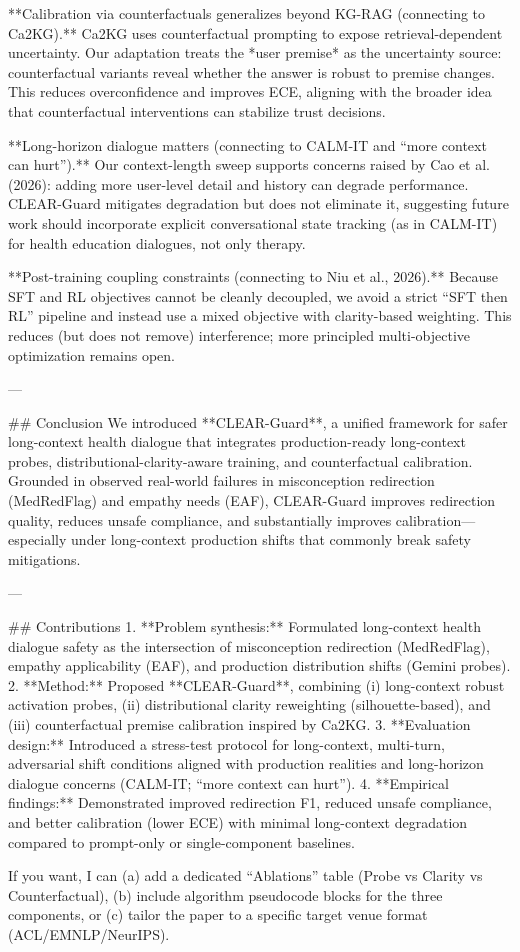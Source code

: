 **Calibration via counterfactuals generalizes beyond KG-RAG (connecting to Ca2KG).**  
Ca2KG uses counterfactual prompting to expose retrieval-dependent uncertainty. Our adaptation treats the *user premise* as the uncertainty source: counterfactual variants reveal whether the answer is robust to premise changes. This reduces overconfidence and improves ECE, aligning with the broader idea that counterfactual interventions can stabilize trust decisions.

**Long-horizon dialogue matters (connecting to CALM-IT and “more context can hurt”).**  
Our context-length sweep supports concerns raised by Cao et al. (2026): adding more user-level detail and history can degrade performance. CLEAR-Guard mitigates degradation but does not eliminate it, suggesting future work should incorporate explicit conversational state tracking (as in CALM-IT) for health education dialogues, not only therapy.

**Post-training coupling constraints (connecting to Niu et al., 2026).**  
Because SFT and RL objectives cannot be cleanly decoupled, we avoid a strict “SFT then RL” pipeline and instead use a mixed objective with clarity-based weighting. This reduces (but does not remove) interference; more principled multi-objective optimization remains open.

---

## Conclusion  
We introduced **CLEAR-Guard**, a unified framework for safer long-context health dialogue that integrates production-ready long-context probes, distributional-clarity-aware training, and counterfactual calibration. Grounded in observed real-world failures in misconception redirection (MedRedFlag) and empathy needs (EAF), CLEAR-Guard improves redirection quality, reduces unsafe compliance, and substantially improves calibration—especially under long-context production shifts that commonly break safety mitigations.  

---

## Contributions  
1. **Problem synthesis:** Formulated long-context health dialogue safety as the intersection of misconception redirection (MedRedFlag), empathy applicability (EAF), and production distribution shifts (Gemini probes).  
2. **Method:** Proposed **CLEAR-Guard**, combining (i) long-context robust activation probes, (ii) distributional clarity reweighting (silhouette-based), and (iii) counterfactual premise calibration inspired by Ca2KG.  
3. **Evaluation design:** Introduced a stress-test protocol for long-context, multi-turn, adversarial shift conditions aligned with production realities and long-horizon dialogue concerns (CALM-IT; “more context can hurt”).  
4. **Empirical findings:** Demonstrated improved redirection F1, reduced unsafe compliance, and better calibration (lower ECE) with minimal long-context degradation compared to prompt-only or single-component baselines.

If you want, I can (a) add a dedicated “Ablations” table (Probe vs Clarity vs Counterfactual), (b) include algorithm pseudocode blocks for the three components, or (c) tailor the paper to a specific target venue format (ACL/EMNLP/NeurIPS).